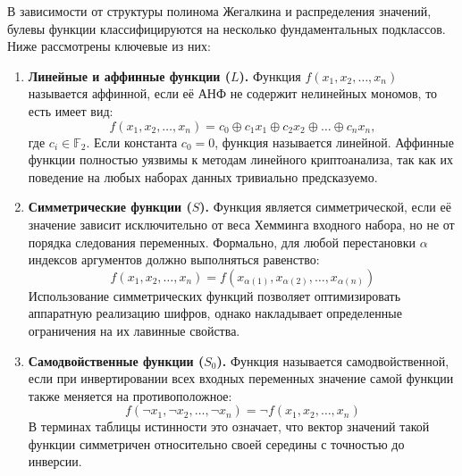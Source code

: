 \documentclass[14pt, a4paper]{extarticle}
\begin{document}
\vspace{2em}
\vspace{1em}

В зависимости от структуры полинома Жегалкина и распределения значений,
булевы функции классифицируются на несколько фундаментальных подклассов.
Ниже рассмотрены ключевые из них:

\begin{enumerate}
    \item \textbf{Линейные и аффинные функции ($L$).}
    Функция $f(x_1, x_2, \dots, x_n)$ называется аффинной, если её АНФ не содержит нелинейных мономов, то есть имеет вид:
    \begin{equation*}
    f(x_1, x_2, \dots, x_n) = c_0 \oplus c_1x_1 \oplus c_2x_2 \oplus \dots \oplus c_nx_n,
    \end{equation*}
    где $c_i \in \mathbb{F}_2$.
    Если константа $c_0 = 0$, функция называется линейной.
    Аффинные функции полностью уязвимы к методам линейного криптоанализа, так как их поведение на любых наборах данных тривиально предсказуемо.

    \item \textbf{Симметрические функции ($S$).}
    Функция является симметрической, если её значение зависит исключительно от веса Хемминга входного набора, но не от порядка следования переменных. 
    Формально, для любой перестановки $\alpha$ индексов аргументов должно выполняться равенство:
    \begin{equation*}
    f(x_1, x_2, \dots, x_n) = f(x_{\alpha(1)}, x_{\alpha(2)}, \dots, x_{\alpha(n)})
    \end{equation*}
    Использование симметрических функций позволяет оптимизировать аппаратную реализацию шифров, однако накладывает определенные ограничения на их лавинные свойства.

    \item \textbf{Самодвойственные функции ($S_0$).}
    Функция называется самодвойственной, если при инвертировании всех входных переменных значение самой функции также меняется на противоположное:
    \begin{equation*}
    f(\neg x_1, \neg x_2, \dots, \neg x_n) = \neg f(x_1, x_2, \dots, x_n)
    \end{equation*}
    В терминах таблицы истинности это означает, что вектор значений такой функции симметричен относительно своей середины с точностью до инверсии.
\end{enumerate}
\end{document}
